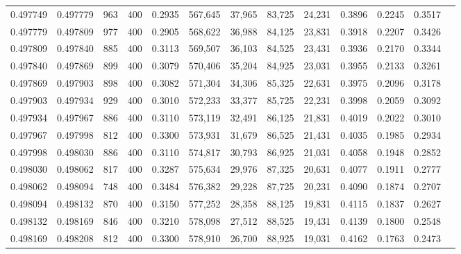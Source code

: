 \begin{tabular}{rrrrrrrrrrrrr}
0.497749 & 0.497779 &    963 & 400 &                                     0.2935 & 567,645 &  37,965 &  83,725 &  24,231 & 0.3896 & 0.2245 & 0.3517 \\
0.497779 & 0.497809 &    977 & 400 &                                     0.2905 & 568,622 &  36,988 &  84,125 &  23,831 & 0.3918 & 0.2207 & 0.3426 \\
0.497809 & 0.497840 &    885 & 400 &                                     0.3113 & 569,507 &  36,103 &  84,525 &  23,431 & 0.3936 & 0.2170 & 0.3344 \\
0.497840 & 0.497869 &    899 & 400 &                                     0.3079 & 570,406 &  35,204 &  84,925 &  23,031 & 0.3955 & 0.2133 & 0.3261 \\
0.497869 & 0.497903 &    898 & 400 &                                     0.3082 & 571,304 &  34,306 &  85,325 &  22,631 & 0.3975 & 0.2096 & 0.3178 \\
0.497903 & 0.497934 &    929 & 400 &                                     0.3010 & 572,233 &  33,377 &  85,725 &  22,231 & 0.3998 & 0.2059 & 0.3092 \\
0.497934 & 0.497967 &    886 & 400 &                                     0.3110 & 573,119 &  32,491 &  86,125 &  21,831 & 0.4019 & 0.2022 & 0.3010 \\
0.497967 & 0.497998 &    812 & 400 &                                     0.3300 & 573,931 &  31,679 &  86,525 &  21,431 & 0.4035 & 0.1985 & 0.2934 \\
0.497998 & 0.498030 &    886 & 400 &                                     0.3110 & 574,817 &  30,793 &  86,925 &  21,031 & 0.4058 & 0.1948 & 0.2852 \\
0.498030 & 0.498062 &    817 & 400 &                                     0.3287 & 575,634 &  29,976 &  87,325 &  20,631 & 0.4077 & 0.1911 & 0.2777 \\
0.498062 & 0.498094 &    748 & 400 &                                     0.3484 & 576,382 &  29,228 &  87,725 &  20,231 & 0.4090 & 0.1874 & 0.2707 \\
0.498094 & 0.498132 &    870 & 400 &                                     0.3150 & 577,252 &  28,358 &  88,125 &  19,831 & 0.4115 & 0.1837 & 0.2627 \\
0.498132 & 0.498169 &    846 & 400 &                                     0.3210 & 578,098 &  27,512 &  88,525 &  19,431 & 0.4139 & 0.1800 & 0.2548 \\
0.498169 & 0.498208 &    812 & 400 &                                     0.3300 & 578,910 &  26,700 &  88,925 &  19,031 & 0.4162 & 0.1763 & 0.2473 \\

\end{tabular}
